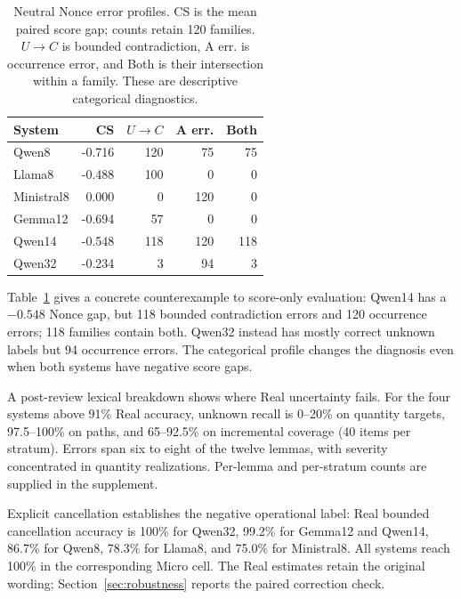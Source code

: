\documentclass[sigconf,anonymous,review]{acmart}
\begin{document}
\begin{table}[t]
\centering
\caption{Neutral Nonce error profiles. CS is the mean paired score gap; counts retain 120 families. $U\!\to\!C$ is bounded contradiction, A err. is occurrence error, and Both is their intersection within a family. These are descriptive categorical diagnostics.}
\label{tab:profile}
\setlength{\tabcolsep}{4pt}
\begin{tabular}{lrrrr}
\toprule
System & CS & $U\!\to\!C$ & A err. & Both\\
\midrule
Qwen8 & -0.716 & 120 & 75 & 75 \\
Llama8 & -0.488 & 100 & 0 & 0 \\
Ministral8 & 0.000 & 0 & 120 & 0 \\
Gemma12 & -0.694 & 57 & 0 & 0 \\
Qwen14 & -0.548 & 118 & 120 & 118 \\
Qwen32 & -0.234 & 3 & 94 & 3 \\
\bottomrule
\end{tabular}
\end{table}

Table~\ref{tab:profile} gives a concrete counterexample to score-only evaluation: Qwen14 has a $-0.548$ Nonce gap, but 118 bounded contradiction errors and 120 occurrence errors; 118 families contain both. Qwen32 instead has mostly correct unknown labels but 94 occurrence errors. The categorical profile changes the diagnosis even when both systems have negative score gaps.

A post-review lexical breakdown shows where Real uncertainty fails. For the four systems above 91\% Real accuracy, unknown recall is 0--20\% on quantity targets, 97.5--100\% on paths, and 65--92.5\% on incremental coverage (40 items per stratum). Errors span six to eight of the twelve lemmas, with severity concentrated in quantity realizations. Per-lemma and per-stratum counts are supplied in the supplement.

Explicit cancellation establishes the negative operational label: Real bounded cancellation accuracy is 100\% for Qwen32, 99.2\% for Gemma12 and Qwen14, 86.7\% for Qwen8, 78.3\% for Llama8, and 75.0\% for Ministral8. All systems reach 100\% in the corresponding Micro cell. The Real estimates retain the original wording; Section~\ref{sec:robustness} reports the paired correction check.
\end{document}
